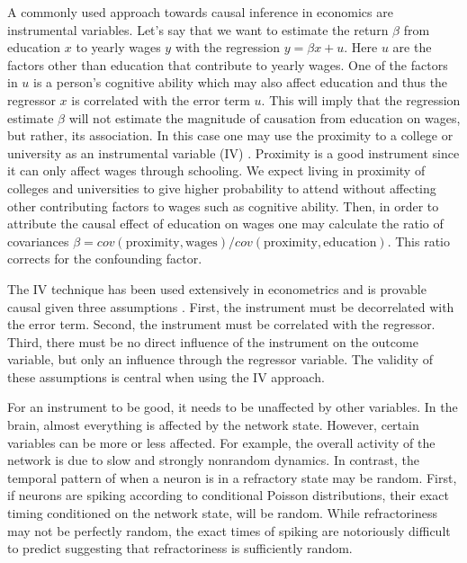 \documentclass[11pt]{article}
\begin{document}
A commonly used approach towards causal inference in economics are instrumental variables. 
Let's say that we want to estimate the return $ \beta $ from education $ x $ to yearly wages $ y $ with the regression $ y = \beta x + u $. 
Here $ u $ are the factors other than education that contribute to yearly wages. 
One of the factors in $ u $ is a person's cognitive ability which may also affect education and thus the regressor $ x $  is correlated with the error term $ u $. 
This will imply that the regression estimate $ \beta $ will not estimate the magnitude of causation from education on wages, but rather, its association. 
In this case one may use the proximity to a college or university as an instrumental variable (IV) \citep{card1993using}. 
Proximity is a good instrument since it can only affect wages through schooling. 
We expect living in proximity of colleges and universities to give higher probability to attend without affecting other contributing factors to wages such as cognitive ability. 
Then, in order to attribute the causal effect of education on wages one may calculate the ratio of covariances $ \beta = cov(\mathrm{proximity},\mathrm{wages})/cov(\mathrm{proximity},\mathrm{education})$. 
This ratio corrects for the confounding factor.

The IV technique has been used extensively in econometrics and is provable causal given three assumptions \citep{angrist2008mostly}. 
First, the instrument must be decorrelated with the error term. 
Second, the instrument must be correlated with the regressor. 
Third, there must be no direct influence of the instrument on the outcome variable, but only an influence through the regressor variable. 
The validity of these assumptions is central when using the IV approach.

For an instrument to be good, it needs to be unaffected by other variables. 
In the brain, almost everything is affected by the network state. 
However, certain variables can be more or less affected. 
For example, the overall activity of the network is due to slow and strongly nonrandom dynamics. 
In contrast, the temporal pattern of when a neuron is in a refractory state may be random. 
First, if neurons are spiking according to conditional Poisson distributions, their exact timing conditioned on the network state, will be random. 
While refractoriness may not be perfectly random, the exact times of spiking are notoriously difficult to predict \citep{stevenson2008inferring} suggesting that refractoriness is sufficiently random.
\end{document}
